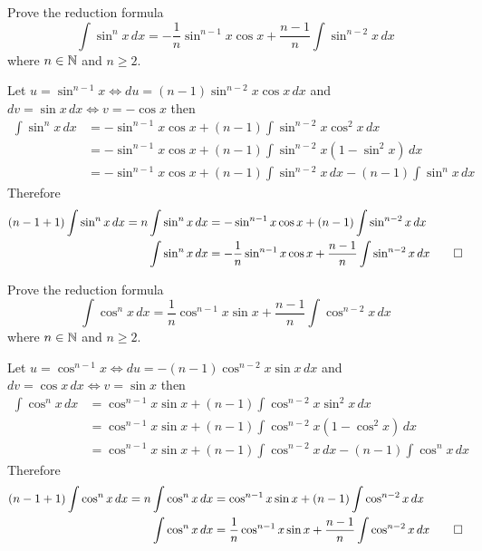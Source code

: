 \begin{problem}
    Prove the reduction formula
    \[\int\sin^n x\,dx
    =-\frac{1}{n}\sin^{n-1}x\cos x+\frac{n-1}{n}\int\sin^{n-2}x\,dx\]
    where \(n\in\mathbb{N}\) and \(n\geq 2\).
\end{problem}
\begin{solution}
    Let \(u=\sin^{n-1}x\iff du=(n-1)\sin^{n-2}x\cos x\,dx\) and
    \(dv=\sin x\,dx\iff v=-\cos x\) then
    \begin{align*}
        \int\sin^n x\,dx
        &= -\sin^{n-1}x\cos x+(n-1)\int \sin^{n-2}x\cos^2 x\,dx \\
        &= -\sin^{n-1}x\cos x+(n-1)\int \sin^{n-2}x(1-\sin^2 x)\,dx \\
        &= -\sin^{n-1}x\cos x+(n-1)\int \sin^{n-2}x\,dx-(n-1)\int\sin^n x\,dx
    \end{align*}
    Therefore
    \begin{align*}
        (n-1+1)\int\sin^n x\,dx=n\int\sin^n x\,dx
        &= -\sin^{n-1}x\cos x+(n-1)\int \sin^{n-2}x\,dx \\
        \int\sin^n x\,dx
        &= -\frac{1}{n}\sin^{n-1}x\cos x
        +\frac{n-1}{n}\int\sin^{n-2}x\,dx \qedhere
    \end{align*}
\end{solution}
\begin{problem}
    Prove the reduction formula
    \[\int\cos^n x\,dx
    =\frac{1}{n}\cos^{n-1}x\sin x+\frac{n-1}{n}\int\cos^{n-2}x\,dx\]
    where \(n\in\mathbb{N}\) and \(n\geq 2\).
\end{problem}
\begin{solution}
    Let \(u=\cos^{n-1}x\iff du=-(n-1)\cos^{n-2}x\sin x\,dx\) and
    \(dv=\cos x\,dx\iff v=\sin x\) then
    \begin{align*}
        \int\cos^n x\,dx
        &= \cos^{n-1} x\sin x+(n-1)\int\cos^{n-2}x\sin^2 x\,dx \\
        &= \cos^{n-1} x\sin x+(n-1)\int \cos^{n-2}x(1-\cos^2 x)\,dx \\
        &= \cos^{n-1} x\sin x+(n-1)\int \cos^{n-2}x\,dx-(n-1)\int\cos^n x\,dx
    \end{align*}
    Therefore
    \begin{align*}
        (n-1+1)\int\cos^n x\,dx=n\int\cos^n x\,dx
        &= \cos^{n-1}x\sin x+(n-1)\int \cos^{n-2}x\,dx \\
        \int\cos^n x\,dx
        &= \frac{1}{n}\cos^{n-1}x\sin x
        +\frac{n-1}{n}\int\cos^{n-2}x\,dx \qedhere
    \end{align*}
\end{solution}
